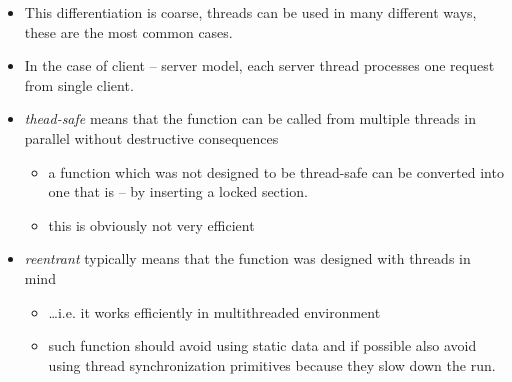\begin{itemize}
\item This differentiation is coarse, threads can be used in many different
ways, these are the most common cases.
\item In the case of client -- server model, each server thread processes
one request from single client.
\end{itemize}



\begin{slide}

\begin{itemize}
\item \emph{thead-safe} means that the function can be called from multiple
threads in parallel without destructive consequences
\begin{itemize}
\item a function which was not designed to be thread-safe can be
converted into one that is -- by inserting a locked section.
\item this is obviously not very efficient
\end{itemize}
\item \emph{reentrant} typically means that the function was designed
with threads in mind
\begin{itemize}
\item \dots{}i.e. it works efficiently in multithreaded environment
\item such function should avoid using static data and if possible also
avoid using thread synchronization primitives because they slow down 
the run.
\end{itemize}
\end{itemize}
\end{slide}

\label{THREADSAFE}

